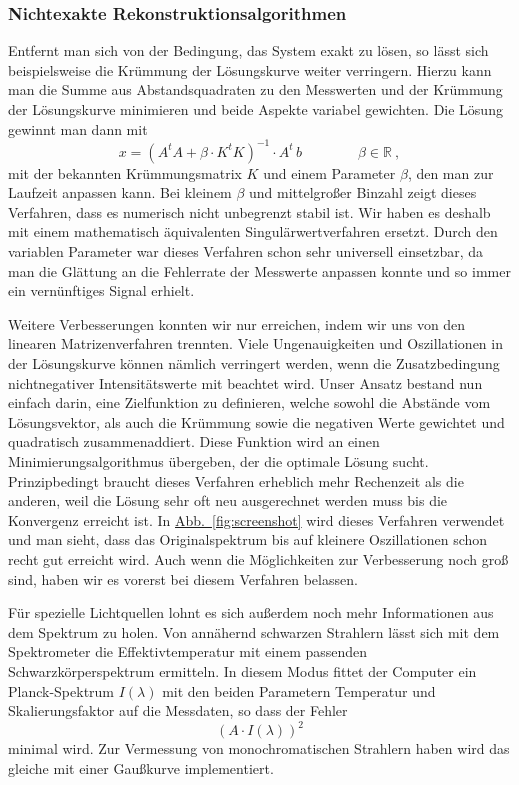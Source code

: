 \documentclass[11pt]{scrartcl}
\newcommand{\hypref}[2]{\hyperref[#2]{{#1}~\ref{#2}}}
\begin{document}
\subsubsection{Nichtexakte Rekonstruktionsalgorithmen}
Entfernt man sich von der Bedingung, das System exakt zu lösen, so lässt sich beispielsweise die Krümmung der Lösungskurve weiter verringern.
Hierzu kann man die Summe aus Abstandsquadraten zu den Messwerten und der Krümmung der Lösungskurve minimieren und beide Aspekte variabel gewichten.
Die Lösung gewinnt man dann mit
\begin{equation}
x = (A^tA+\beta\cdot K^tK)^{-1}\cdot A^t\,b
\qquad\qquad
\beta\in\mathbb{R} \ ,
\end{equation}
mit der bekannten Krümmungsmatrix $K$ und einem Parameter $\beta$, den man zur Laufzeit anpassen kann.
Bei kleinem $\beta$ und mittelgroßer Binzahl zeigt dieses Verfahren, dass es numerisch nicht unbegrenzt stabil ist.
Wir haben es deshalb mit einem mathematisch äquivalenten Singulärwertverfahren ersetzt.
Durch den variablen Parameter war dieses Verfahren schon sehr universell einsetzbar, da man die Glättung an die Fehlerrate der Messwerte anpassen konnte und so immer ein vernünftiges Signal erhielt.

Weitere Verbesserungen konnten wir nur erreichen, indem wir uns von den linearen Matrizenverfahren trennten.
Viele Ungenauigkeiten und Oszillationen in der Lösungskurve können nämlich verringert werden, wenn die Zusatzbedingung nichtnegativer Intensitätswerte mit beachtet wird.
Unser Ansatz bestand nun einfach darin, eine Zielfunktion zu definieren, welche sowohl die Abstände vom Lösungsvektor, als auch die Krümmung sowie die negativen Werte gewichtet und quadratisch zusammenaddiert.
Diese Funktion wird an einen Minimierungsalgorithmus übergeben, der die optimale Lösung sucht.
Prinzipbedingt braucht dieses Verfahren erheblich mehr Rechenzeit als die anderen, weil die Lösung sehr oft neu ausgerechnet werden muss bis die Konvergenz erreicht ist.
In \hypref{Abb.}{fig:screenshot} wird dieses Verfahren verwendet und man sieht, dass das Originalspektrum bis auf kleinere Oszillationen schon recht gut erreicht wird.
Auch wenn die Möglichkeiten zur Verbesserung noch groß sind, haben wir es vorerst bei diesem Verfahren belassen.

Für spezielle Lichtquellen lohnt es sich außerdem noch mehr Informationen aus dem Spektrum zu holen.
Von annähernd schwarzen Strahlern lässt sich mit dem Spektrometer die Effektivtemperatur mit einem passenden Schwarzkörperspektrum ermitteln.
In diesem Modus fittet der Computer ein Planck-Spektrum $I(\lambda)$ mit den beiden Parametern Temperatur und Skalierungsfaktor auf die Messdaten, so dass der Fehler
\begin{equation}
\left(
A\cdot I(\lambda)
\right)^2
\end{equation}
minimal wird.
Zur Vermessung von monochromatischen Strahlern haben wird das gleiche mit einer Gaußkurve implementiert.
\end{document}
